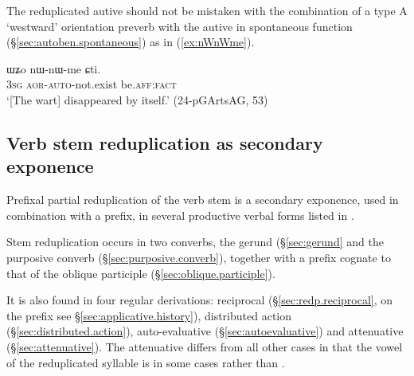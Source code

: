 The reduplicated autive should not be mistaken with the combination of a type A `westward' orientation preverb  with the autive in spontaneous function (§\ref{sec:autoben.spontaneous})  as in (\ref{ex:nWnWme}).

\begin{exe}
\ex \label{ex:nWnWme}
\gll ɯʑo nɯ-nɯ-me ɕti. \\
\textsc{3sg} \textsc{aor}-\textsc{auto}-not.exist be.\textsc{aff}:\textsc{fact} \\
\glt `[The wart] disappeared by itself.' (24-pGArtsAG, 53)
\end{exe}
\subsection{Verb stem reduplication as secondary exponence} \label{sec:verb.stem.redp}
Prefixal partial reduplication of the verb stem is a secondary exponence, used in combination with a prefix, in several productive verbal forms listed in . 

Stem reduplication occurs in two converbs, the gerund (§\ref{sec:gerund} and the purposive converb (§\ref{sec:purposive.converb}), together with a  prefix cognate to that of the oblique participle (§\ref{sec:oblique.participle}).

It is also found in four regular derivations: reciprocal (§\ref{sec:redp.reciprocal}, on the  prefix see §\ref{sec:applicative.history}), distributed action (§\ref{sec:distributed.action}), auto-evaluative (§\ref{sec:autoevaluative}) and attenuative (§\ref{sec:attenuative}). The attenuative differs from all other cases in that the vowel of the reduplicated syllable is in some cases  rather than .

